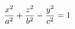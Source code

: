 \documentclass[preview]{standalone}
\begin{document}
\begin{align*}
\special{dvisvgm:raw <g id='unique000'>}\dfrac{x^2}{a^2}+\dfrac{z^2}{b^2}-\dfrac{y^2}{c^2}=1\special{dvisvgm:raw </g>}
\end{align*}
\end{document}
